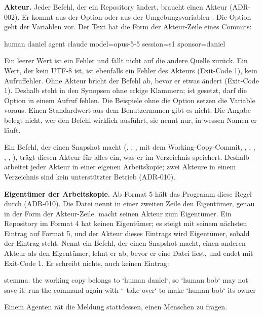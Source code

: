 {\bf Akteur.} Jeder Befehl, der ein Repository ändert, braucht einen Akteur (ADR-002).
Er kommt aus der Option  oder aus der Umgebungsvariablen .
Die Option geht der Variablen vor. Der Text hat die Form der Akteur-Zeile eines Commits:

\starttyping
human daniel
agent claude model=opus-5-5 session=s1 sponsor=daniel
\stoptyping

Ein leerer Wert ist ein Fehler und fällt nicht auf die andere Quelle zurück.
Ein Wert, der kein UTF-8 ist, ist ebenfalls ein Fehler des Akteurs (Exit-Code 1),
kein Aufruffehler.
Ohne Akteur bricht der Befehl ab, bevor er etwas ändert (Exit-Code 1).
Deshalb steht  in den Synopsen ohne eckige Klammern; ist 
gesetzt, darf die Option in einem Aufruf fehlen. Die Beispiele ohne die Option
setzen die Variable voraus. Einen Standardwert aus
dem Benutzernamen gibt es nicht. Die Angabe belegt nicht, wer den Befehl wirklich ausführt,
sie nennt nur, in wessen Namen er läuft.

Ein Befehl, der einen Snapshot macht (, , ,
 mit dem Working-Copy-Commit, , , ,
, , ), trägt diesen
Akteur für alles ein, was er im Verzeichnis speichert.
Deshalb arbeitet jeder Akteur in einer eigenen Arbeitskopie; zwei Akteure in einem
Verzeichnis sind kein unterstützter Betrieb (ADR-010).

{\bf Eigentümer der Arbeitskopie.} Ab Format 5 hält das Programm diese Regel durch (ADR-010).
Die Datei  nennt in einer zweiten Zeile 
den Eigentümer, genau in der Form der Akteur-Zeile.
 macht seinen Akteur zum Eigentümer.
Ein Repository im Format 4 hat keinen Eigentümer;
es steigt mit seinem nächsten Eintrag auf Format 5,
und der Akteur dieses Eintrags wird Eigentümer, sobald der Eintrag steht.
Nennt ein Befehl, der einen Snapshot macht, einen anderen Akteur als den Eigentümer,
lehnt er ab, bevor er eine Datei liest, und endet mit Exit-Code 1.
Er schreibt nichts, auch keinen Eintrag:

\starttyping
stemma: the working copy belongs to `human daniel`, so `human bob` may not save it; run the
command again with `--take-over` to make `human bob` its owner
\stoptyping

Einem Agenten rät die Meldung stattdessen, einen Menschen zu fragen.

